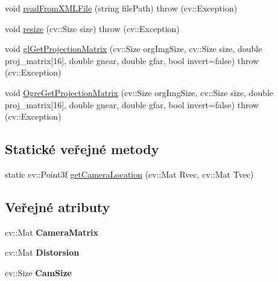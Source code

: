 \begin{DoxyCompactItemize}
void \hyperlink{classaruco_1_1_camera_parameters_a866dbc61304f56166da41220e94f4f0f}{read\-From\-X\-M\-L\-File} (string file\-Path)  throw (cv\-::\-Exception)
\item 
void \hyperlink{classaruco_1_1_camera_parameters_aabf139725fb75759b4172a53de63100f}{resize} (cv\-::\-Size size)  throw (cv\-::\-Exception)
\item 
void \hyperlink{classaruco_1_1_camera_parameters_adbfb82ecadfbe6c59c47798f558064ac}{gl\-Get\-Projection\-Matrix} (cv\-::\-Size org\-Img\-Size, cv\-::\-Size size, double proj\-\_\-matrix\mbox{[}16\mbox{]}, double gnear, double gfar, bool invert=false)  throw (cv\-::\-Exception)
\item 
void \hyperlink{classaruco_1_1_camera_parameters_adb5924aaec7e149ba5ea509158663540}{Ogre\-Get\-Projection\-Matrix} (cv\-::\-Size org\-Img\-Size, cv\-::\-Size size, double proj\-\_\-matrix\mbox{[}16\mbox{]}, double gnear, double gfar, bool invert=false)  throw (cv\-::\-Exception)
\end{DoxyCompactItemize}
\subsection*{Statické veřejné metody}
\begin{DoxyCompactItemize}
\item 
static cv\-::\-Point3f \hyperlink{classaruco_1_1_camera_parameters_ab3f102b448814ed007788d9d6020beb2}{get\-Camera\-Location} (cv\-::\-Mat Rvec, cv\-::\-Mat Tvec)
\end{DoxyCompactItemize}
\subsection*{Veřejné atributy}
\begin{DoxyCompactItemize}
\item 
\hypertarget{classaruco_1_1_camera_parameters_a5210f7dd5f0f4f0fea728357005d6bcd}{cv\-::\-Mat {\bfseries Camera\-Matrix}}\label{d6/d88/classaruco_1_1_camera_parameters_a5210f7dd5f0f4f0fea728357005d6bcd}

\item 
\hypertarget{classaruco_1_1_camera_parameters_a33a5ab0b2f00a4753a2fda307e24360a}{cv\-::\-Mat {\bfseries Distorsion}}\label{d6/d88/classaruco_1_1_camera_parameters_a33a5ab0b2f00a4753a2fda307e24360a}

\item 
\hypertarget{classaruco_1_1_camera_parameters_a08fdd4888daf7140cf31bdd341c3f303}{cv\-::\-Size {\bfseries Cam\-Size}}\label{d6/d88/classaruco_1_1_camera_parameters_a08fdd4888daf7140cf31bdd341c3f303}

\end{DoxyCompactItemize}


